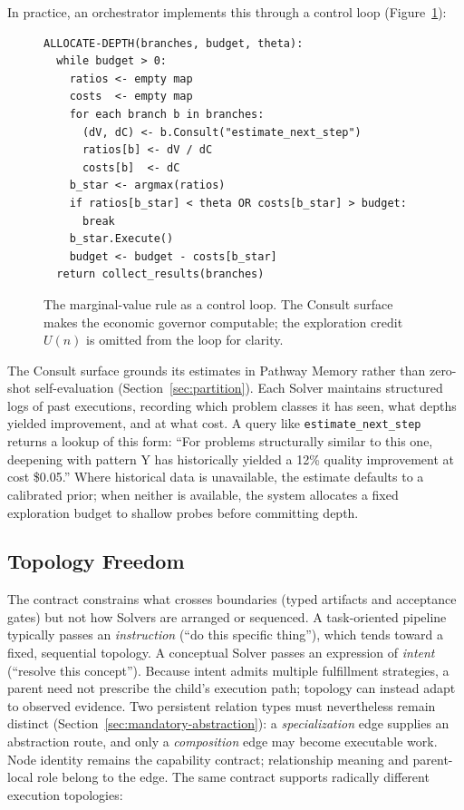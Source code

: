 \documentclass[11pt]{article}
\let\oldtexttt\texttt
\renewcommand{\texttt}[1]{\oldtexttt{\small #1}}
\begin{document}
In practice, an orchestrator implements this through a control loop (Figure~\ref{fig:mvr-loop}):

\begin{figure}[H]
\begin{rfbox}
\small
\begin{verbatim}
ALLOCATE-DEPTH(branches, budget, theta):
  while budget > 0:
    ratios <- empty map
    costs  <- empty map
    for each branch b in branches:
      (dV, dC) <- b.Consult("estimate_next_step")
      ratios[b] <- dV / dC
      costs[b]  <- dC
    b_star <- argmax(ratios)
    if ratios[b_star] < theta OR costs[b_star] > budget:
      break
    b_star.Execute()
    budget <- budget - costs[b_star]
  return collect_results(branches)
\end{verbatim}
\end{rfbox}
\caption{The marginal-value rule as a control loop. The Consult surface makes the economic governor computable; the exploration credit $U(n)$ is omitted from the loop for clarity.}
\label{fig:mvr-loop}
\end{figure}

\noindent The Consult surface grounds its estimates in Pathway Memory rather than zero-shot self-evaluation (Section~\ref{sec:partition}). Each Solver maintains structured logs of past executions, recording which problem classes it has seen, what depths yielded improvement, and at what cost. A query like \texttt{estimate\_next\_step} returns a lookup of this form: ``For problems structurally similar to this one, deepening with pattern Y has historically yielded a 12\% quality improvement at cost \$0.05.'' Where historical data is unavailable, the estimate defaults to a calibrated prior; when neither is available, the system allocates a fixed exploration budget to shallow probes before committing depth.

\subsection{Topology Freedom}
\label{sec:topology}

The contract constrains what crosses boundaries (typed artifacts and acceptance gates) but not how Solvers are arranged or sequenced. A task-oriented pipeline typically passes an \emph{instruction} (``do this specific thing''), which tends toward a fixed, sequential topology. A conceptual Solver passes an expression of \emph{intent} (``resolve this concept''). Because intent admits multiple fulfillment strategies, a parent need not prescribe the child's execution path; topology can instead adapt to observed evidence. Two persistent relation types must nevertheless remain distinct (Section~\ref{sec:mandatory-abstraction}): a \emph{specialization} edge supplies an abstraction route, and only a \emph{composition} edge may become executable work. Node identity remains the capability contract; relationship meaning and parent-local role belong to the edge. The same contract supports radically different execution topologies:
\end{document}
